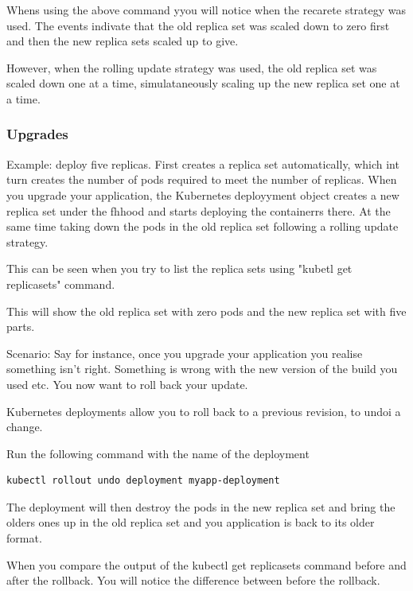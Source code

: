\documentclass[11pt]{book}
\begin{document}
    Whens using the above command yyou will notice when the recarete strategy was used.
    The events indivate that the old replica set was scaled down to zero first and then the new replica sets scaled up to give.

    However, when the rolling update strategy was used, the old replica set was scaled down one at a time,
    simulataneously scaling up the new replica set one at a time.

    \subsubsection{Upgrades}
    Example: deploy five replicas.
    First creates a replica set automatically, which int turn creates the number of pods required to meet the number of replicas.
    When you upgrade your application, the Kubernetes deployyment object creates a new replica set under the fhhood and starts deploying the containerrs there.
    At the same time taking down the pods in the old replica set following a rolling update strategy.

    This can be seen when you try to list the replica sets using "kubetl get replicasets" command.

    This will show the old replica set with zero pods and the new replica set with five parts.

    Scenario:
    Say for instance, once you upgrade your application you realise something isn't right. Something is wrong with the new version of the build you used etc.
    You now want to roll back your update.

    Kubernetes deployments allow you to roll back to a previous revision, to undoi a change.


    Run the following command with the name of the deployment
    \begin{lstlisting}[language=terminal, caption={Commands}]
        kubectl rollout undo deployment myapp-deployment
    \end{lstlisting}

    The deployment will then destroy the pods in the new replica set and bring the olders ones up in the old replica set and you application is back to its older format.

    When you compare the output of the kubectl get replicasets command before and after the rollback. You will notice the difference between before the rollback.
\end{document}
